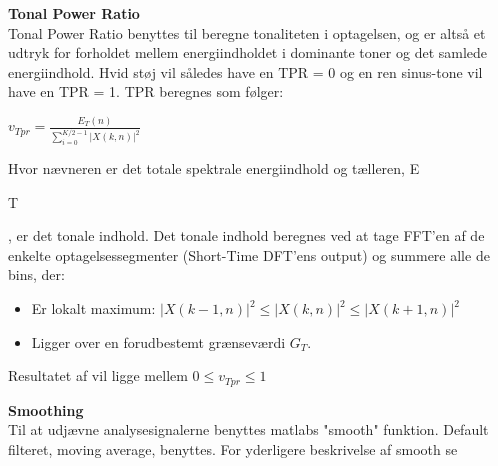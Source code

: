 \textbf{Tonal Power Ratio} \\
Tonal Power Ratio benyttes til beregne tonaliteten i optagelsen, og er altså et udtryk for forholdet mellem energiindholdet i dominante toner og det samlede energiindhold. Hvid støj vil således have en TPR = 0 og en ren sinus-tone vil have en TPR = 1. TPR beregnes som følger: 
\begin{center}
${ v }_{ Tpr }=\frac { { E }_{ T }(n) }{ \sum _{ i=0 }^{ K/2-1 }{ { \left| X(k,n) \right|  }^{ 2 } }  } $
\end{center}

Hvor nævneren er det totale spektrale energiindhold og tælleren, E\begin{tiny}T\end{tiny}, er det tonale indhold. Det tonale indhold beregnes ved at tage FFT'en af de enkelte optagelsessegmenter (Short-Time DFT'ens output) og summere alle de bins, der:
\begin{itemize}
	\item Er lokalt maximum: ${ \left| X(k-1,n) \right|  }^{ 2 }\le { \left| X(k,n) \right|  }^{ 2 }\le { \left| X(k+1,n) \right|  }^{ 2 }$
	\item Ligger over en forudbestemt grænseværdi ${ G }_{ T }$.
\end{itemize} 	

Resultatet af vil ligge mellem $0\le { v }_{ Tpr }\le 1$

\textbf{Smoothing} \\
Til at udjævne analysesignalerne benyttes matlabs "smooth" funktion. Default filteret, moving average, benyttes. For yderligere beskrivelse af smooth se \citep{website:smooth}

